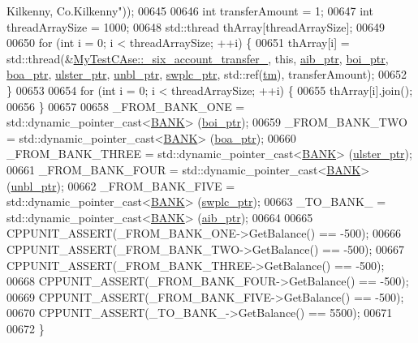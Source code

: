 \begin{DoxyCode}
{       Kilkenny, Co.Kilkenny"}));
00645     
00646     \textcolor{keywordtype}{int} transferAmount = 1;
00647     \textcolor{keywordtype}{int} threadArraySize = 1000; 
00648     std::thread thArray[threadArraySize];
00649 
00650     \textcolor{keywordflow}{for} (\textcolor{keywordtype}{int} i = 0; i < threadArraySize; ++i) \{
00651         thArray[i] = std::thread(&\hyperlink{class_my_test_c_ase_a72ce436fb3c78c3d76b6c48a5a2e6a76_a72ce436fb3c78c3d76b6c48a5a2e6a76}{MyTestCAse::\_six\_account\_transfer\_}, \textcolor{keyword}{
      this}, \hyperlink{class_my_test_c_ase_adad50e8278b64aa0321000b528e5362c_adad50e8278b64aa0321000b528e5362c}{aib\_ptr}, \hyperlink{class_my_test_c_ase_a5554de9e3e6393a89c66c036c529720b_a5554de9e3e6393a89c66c036c529720b}{boi\_ptr}, \hyperlink{class_my_test_c_ase_ae0b2db5d35e25b3139beeda0705494f0_ae0b2db5d35e25b3139beeda0705494f0}{boa\_ptr}, \hyperlink{class_my_test_c_ase_a4f9f72374d3d15be7cdf16412c4d7ed3_a4f9f72374d3d15be7cdf16412c4d7ed3}{ulster\_ptr}, \hyperlink{class_my_test_c_ase_a0ca634b597d6c0e136d632268853d5a7_a0ca634b597d6c0e136d632268853d5a7}{unbl\_ptr}, 
      \hyperlink{class_my_test_c_ase_aa8ccae9a5a7feb5bc47591c55a82d0cd_aa8ccae9a5a7feb5bc47591c55a82d0cd}{swplc\_ptr}, std::ref(\hyperlink{class_my_test_c_ase_a422e6e5d4ddedea384be96031c89b72b_a422e6e5d4ddedea384be96031c89b72b}{tm}), transferAmount);
00652     \}
00653     
00654     \textcolor{keywordflow}{for} (\textcolor{keywordtype}{int} i = 0; i < threadArraySize; ++i) \{
00655         thArray[i].join();
00656     \}
00657     
00658     \_FROM\_BANK\_ONE = std::dynamic\_pointer\_cast<\hyperlink{class_b_a_n_k}{BANK}> (\hyperlink{class_my_test_c_ase_a5554de9e3e6393a89c66c036c529720b_a5554de9e3e6393a89c66c036c529720b}{boi\_ptr});
00659     \_FROM\_BANK\_TWO = std::dynamic\_pointer\_cast<\hyperlink{class_b_a_n_k}{BANK}> (\hyperlink{class_my_test_c_ase_ae0b2db5d35e25b3139beeda0705494f0_ae0b2db5d35e25b3139beeda0705494f0}{boa\_ptr});
00660     \_FROM\_BANK\_THREE = std::dynamic\_pointer\_cast<\hyperlink{class_b_a_n_k}{BANK}> (\hyperlink{class_my_test_c_ase_a4f9f72374d3d15be7cdf16412c4d7ed3_a4f9f72374d3d15be7cdf16412c4d7ed3}{ulster\_ptr});
00661     \_FROM\_BANK\_FOUR = std::dynamic\_pointer\_cast<\hyperlink{class_b_a_n_k}{BANK}> (\hyperlink{class_my_test_c_ase_a0ca634b597d6c0e136d632268853d5a7_a0ca634b597d6c0e136d632268853d5a7}{unbl\_ptr});
00662     \_FROM\_BANK\_FIVE = std::dynamic\_pointer\_cast<\hyperlink{class_b_a_n_k}{BANK}> (\hyperlink{class_my_test_c_ase_aa8ccae9a5a7feb5bc47591c55a82d0cd_aa8ccae9a5a7feb5bc47591c55a82d0cd}{swplc\_ptr});
00663     \_TO\_BANK\_ = std::dynamic\_pointer\_cast<\hyperlink{class_b_a_n_k}{BANK}> (\hyperlink{class_my_test_c_ase_adad50e8278b64aa0321000b528e5362c_adad50e8278b64aa0321000b528e5362c}{aib\_ptr});
00664     
00665     CPPUNIT\_ASSERT(\_FROM\_BANK\_ONE->GetBalance() == -500);
00666     CPPUNIT\_ASSERT(\_FROM\_BANK\_TWO->GetBalance() == -500);
00667     CPPUNIT\_ASSERT(\_FROM\_BANK\_THREE->GetBalance() == -500);
00668     CPPUNIT\_ASSERT(\_FROM\_BANK\_FOUR->GetBalance() == -500);
00669     CPPUNIT\_ASSERT(\_FROM\_BANK\_FIVE->GetBalance() == -500);
00670     CPPUNIT\_ASSERT(\_TO\_BANK\_->GetBalance() == 5500);
00671     
00672 \}
\end{DoxyCode}


